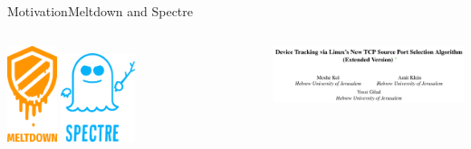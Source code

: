 \documentclass[aspectratio=169, hyperref={colorlinks=true, allcolors=SecondaryColor}, c]{beamer}
\begin{document}
	\begin{frame}[fragile]{Motivation}{Meltdown and Spectre}
		\begin{columns}
			\begin{column}[t]{0.5\textwidth}
				\begin{center}
					\includegraphics[width=0.2\textwidth]{./figures/meltdown.png}\hspace{0.4cm}\cite{MeltdownSecurityVulnerability2024}
					\hspace{0.5cm}
					\includegraphics[width=0.3\textwidth]{./figures/spectre.png}\cite{SpectreSecurityVulnerability2025}
				\end{center}
			\end{column}
			\begin{column}[t]{0.5\textwidth}
				\begin{center}
					\includegraphics[width=\textwidth]{./figures/paper.png}
				\end{center}
			\end{column}
		\end{columns}
		\begin{columns}

\end{columns}
\end{frame}
\end{document}
